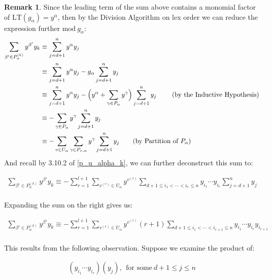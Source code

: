 \documentclass[12pt,reqno]{amsart}
\theoremstyle{plain}
\theoremstyle{definition}
\newtheorem{remark}[theorem]{Remark}
\begin{document}
\begin{remark} \label{bprime_decon}
    Since the leading term of the sum above contains a monomial factor of $\text{LT}(g_\alpha) = y^\alpha$, then by the Division Algorithm on lex order we can reduce the expression further $\text{mod} \ g_\alpha$:
    \begin{align*}
     \sum_{\beta ' \in P_\alpha^{(k)}} y^{\beta'} y_k &\equiv \sum_{j=d+1}^n y^\alpha y_j \\
     &\equiv \sum_{j=d+1}^n y^\alpha y_j - g_\alpha \sum_{j=d+1}^n y_j \\ 
    &\equiv \sum_{j=d+1}^n y^\alpha y_j - \Big(y^\alpha + \sum_{\gamma \in P_\alpha}y^\gamma\Big) \sum_{j=d+1}^n y_j \ \tag{\text{by the Inductive Hypothesis}} \\ 
    &\equiv  -\sum_{\gamma \in P_\alpha}y^\gamma \sum_{j=d+1}^n y_j \\ 
    & \equiv - \sum_{v \in U_\alpha} \sum_{\gamma \in P_{v,\alpha}}y^\gamma \sum_{j=d+1}^n y_j \tag{by Partition of $P_\alpha$} \\
\end{align*}
And recall by 3.10.2 of \ref{p_u_alpha_k}, we can further deconstruct this sum to:

\begin{align*}
      \sum_{\beta ' \in P_\alpha^{(k)}} y^{\beta'} y_k \equiv - \sum_{r=1}^{l+1} \sum_{v^{(r)} \in U_\alpha} y^{v^{(r)}}\sum_{d+1 \leq i_1 < \cdots < i_r \leq n}y_{i_1} \cdots y_{i_r} \sum_{j=d+1}^n y_j\\
\end{align*}

\pagebreak

Expanding the sum on the right gives us:

\begin{align*}
    \sum_{\beta ' \in P_\alpha^{(k)}} y^{\beta'} y_k \equiv - \sum_{r=1}^{l+1} \sum_{v^{(r)} \in U_\alpha} y^{v^{(r)}} (r+1) \sum_{d+1 \leq i_1 < \cdots < i_{r+1} \leq n}y_{i_1} \cdots y_{i_r} y_{i_{r+1}} \\
\end{align*}

\end{remark}

This results from the following observation. Suppose we examine the product of:

\begin{align*}
    (y_{i_1} \cdots y_{i_r})(y_j), \ \ \text{for some} \ d+1 \leq j \leq n \\
\end{align*}
\end{document}
